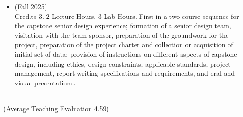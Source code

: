 \documentclass[11pt,oneside]{article}
\begin{document}
\begin{itemize}[leftmargin=40pt, label={-}]
\item {} (Fall 2025)\\
      Credits 3. 2 Lecture Hours. 3 Lab Hours. First in a two-course sequence for the capstone senior design experience; formation of a senior design team, visitation with the team sponsor, preparation of the groundwork for the project, preparation of the project charter and collection or acquisition of initial set of data; provision of instructions on different aspects of capstone design, including ethics, design constraints, applicable standards, project management, report writing specifications and requirements, and oral and visual presentations.
\end{itemize}
\vspace{8pt}
\hspace{40pt}{\frutigerregular Landscape Architecture and Urban Planning, Texas A\&M University}\\
\hspace{40pt}({Average Teaching Evaluation 4.59})
\end{document}
